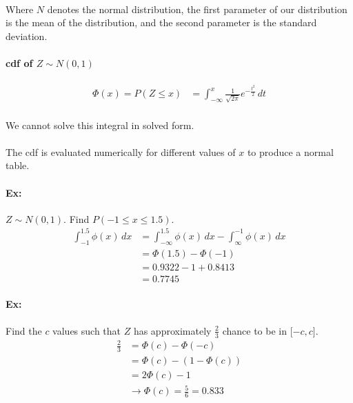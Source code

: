 \documentclass[letterpaper,12pt]{article}
\begin{document}
\paragraph{}Where $N$ denotes the normal distribution, the first parameter of our distribution is the mean
of the distribution, and the second parameter is the standard deviation.
\paragraph{cdf of $Z \sim N(0,1)$}
    \begin{align*}
        \Phi(x) = P(Z \le x) &= \int_{-\infty}^{x}\frac{1}{\sqrt{2\pi}}e^{-\frac{t^2}{2}}\,dt
    \end{align*}
\paragraph{}We cannot solve this integral in solved form.    
\paragraph{}The cdf is evaluated numerically for different values of $x$ to produce a normal table.

\paragraph{Ex:}$Z\sim N(0,1)$. Find $P(-1\le x\le 1.5)$.
\begin{align*}
    \int_{-1}^{1.5} \phi(x)\,dx&= \int_{-\infty}^{1.5}\phi(x)\,dx - \int_{\infty}^{-1}\phi(x)\,dx\\
                               &= \Phi(1.5) - \Phi(-1)\\
                               &= 0.9322-1+0.8413\\
                               &= 0.7745
\end{align*}
\paragraph{Ex:}Find the $c$ values such that $Z$ has approximately $\frac{2}{3}$ chance to be in [$-c,c$].
\begin{align*}
    \frac{2}{3} &= \Phi(c)- \Phi(-c)\\
                &= \Phi(c) - (1-\Phi(c))\\
                &= 2\Phi(c)-1\\
                &\to \Phi(c) = \frac{5}{6} = 0.833
\end{align*}
\end{document}
